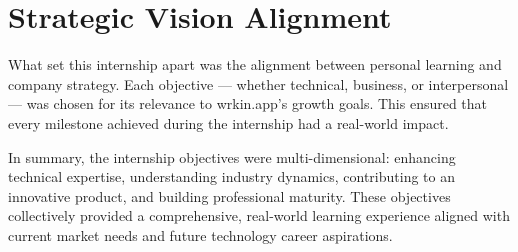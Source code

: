 \section{Strategic Vision Alignment}

What set this internship apart was the alignment between personal learning and company strategy. Each objective — whether technical, business, or interpersonal — was chosen for its relevance to wrkin.app's growth goals. This ensured that every milestone achieved during the internship had a real-world impact.

In summary, the internship objectives were multi-dimensional: enhancing technical expertise, understanding industry dynamics, contributing to an innovative product, and building professional maturity. These objectives collectively provided a comprehensive, real-world learning experience aligned with current market needs and future technology career aspirations.
